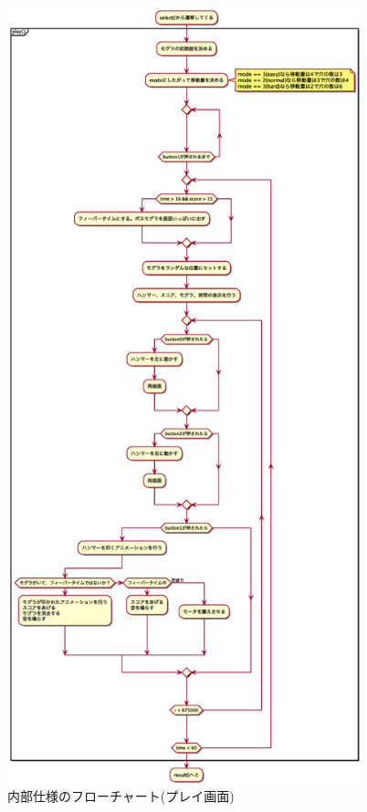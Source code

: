 \documentclass[11pt,a4j]{jsarticle}
\makeatletter
\newcommand{\figcaption}[1]{\def\@captype{figure}\caption{#1}}
\makeatother
\begin{document}
\begin{figure}[H]
  \centering
  \includegraphics[height=225mm]{img/mogura_play.eps}
  \figcaption{内部仕様のフローチャート(プレイ画面)}
  \label{fig:flow2}
\end{figure}
\end{document}
